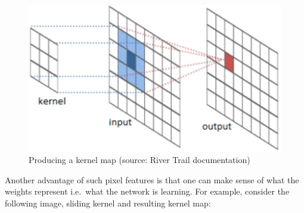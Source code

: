 \documentclass[a4paper,11pt]{article}
\begin{document}
\begin{figure}[h!]
	\centering
	\includegraphics[scale=0.3]{images/kernel_map.png}
	\caption{Producing a kernel map (source: River Trail documentation)}
\end{figure}

Another advantage of such pixel features is that one can make sense of what the weights represent i.e.\ what the network is learning. For example, consider the following image, sliding kernel and resulting kernel map:
\end{document}
